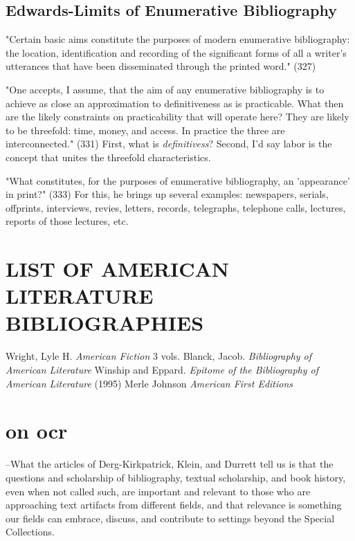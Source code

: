 \documentclass[course, english]{Notes}
\newcommand{\n}{\scalebox{2}{\textbf{\framebox{$\aleph$} } } }
\begin{document}
\begin{outline}
\subsection{Edwards-Limits of Enumerative Bibliography}
\1 "Certain basic aims constitute the purposes of modern enumerative bibliography: the location, identification and recording of the significant forms of all a writer's utterances that have been disseminated through the printed word." (327)

\1 "One accepts, I assume, that the aim of any enumerative bibliography is to achieve as close an approximation to definitiveness as is practicable. What then are the likely constraints on practicability that will operate here? They are likely to be threefold: time, money, and access. In practice the three are interconnected." (331)
	\2 \n First, what is \textit{definitivess}?
	\2 \n Second, I'd say labor is the concept that unites the threefold characteristics. 
	
\1 "What constitutes, for the purposes of enumerative bibliography, an 'appearance' in print?" (333)
	\2 For this, he brings up several examples: newspapers, serials, offprints, interviews, revies, letters, records, telegraphs, telephone calls, lectures, reports of those lectures, etc.
	
\end{outline}

\section{LIST OF AMERICAN LITERATURE BIBLIOGRAPHIES}
\begin{outline}
\1 Wright, Lyle H. \textit{American Fiction} 3 vols.
\1 Blanck, Jacob. \textit{Bibliography of American Literature} 
\1 Winship and Eppard. \textit{Epitome of the Bibliography of American Literature} (1995)
\1 Merle Johnson \textit{American First Editions}
\1 
\end{outline}

\section{on ocr}
\n --What the articles of Derg-Kirkpatrick, Klein, and Durrett tell us is that the questions and scholarship of bibliography, textual scholarship, and book history, even when not called such, are important and relevant to those who are approaching text artifacts from different fields, and that relevance is something our fields can embrace, discuss, and contribute to settings beyond the Special Collections. 
\end{document}
